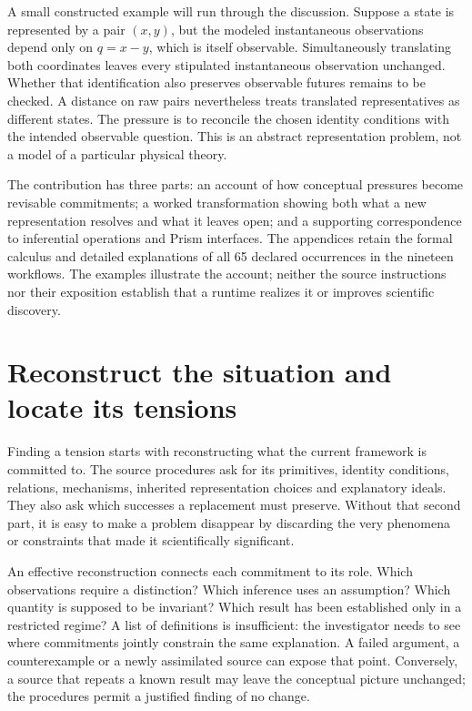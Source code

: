 A small constructed example will run through the discussion. Suppose a state is
represented by a pair $(x,y)$, but the modeled instantaneous observations depend only on
$q=x-y$, which is itself observable. Simultaneously translating both coordinates leaves every stipulated
instantaneous observation unchanged. Whether that identification also preserves
observable futures remains to be checked. A distance on raw pairs nevertheless treats translated
representatives as different states. The pressure is to reconcile the chosen
identity conditions with the intended observable question. This is an abstract
representation problem, not a model of a particular physical theory.

The contribution has three parts: an account of how conceptual pressures become
revisable commitments; a worked transformation showing both what a new
representation resolves and what it leaves open; and a supporting correspondence
to inferential operations and Prism interfaces. The appendices retain the formal
calculus and detailed explanations of all 65 declared occurrences in the nineteen
workflows. The examples illustrate the account; neither the source instructions
nor their exposition establish that a runtime realizes it or improves scientific
discovery.

\section{Reconstruct the situation and locate its tensions}
\label{sec:conceptual-situation}
Finding a tension starts with reconstructing what the current framework is
committed to. The source procedures ask for its primitives, identity conditions,
relations, mechanisms, inherited representation choices and explanatory ideals.
They also ask which successes a replacement must preserve. Without that second
part, it is easy to make a problem disappear by discarding the very phenomena or
constraints that made it scientifically significant.

An effective reconstruction connects each commitment to its role. Which
observations require a distinction? Which inference uses an assumption? Which
quantity is supposed to be invariant? Which result has been established only in a
restricted regime? A list of definitions is insufficient: the investigator needs
to see where commitments jointly constrain the same explanation. A failed
argument, a counterexample or a newly assimilated source can expose that point.
Conversely, a source that repeats a known result may leave the conceptual picture
unchanged; the procedures permit a justified finding of no change.

